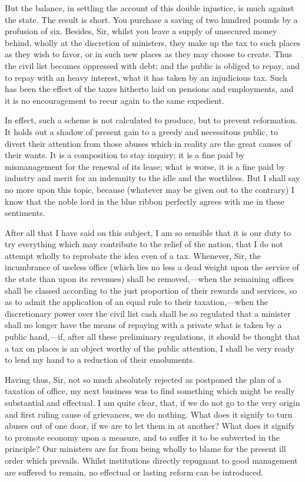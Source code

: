 But the balance, in settling the account of this double injustice, is much against the state. The result is short. You purchase a saving of two hundred pounds by a profusion of six. Besides, Sir, whilst you leave a supply of unsecured money behind, wholly at the discretion of ministers, they make up the tax to such places as they wish to favor, or in such new places as they may choose to create. Thus the civil list becomes oppressed with debt; and the public is obliged to repay, and to repay with an heavy interest, what it has taken by an injudicious tax. Such has been the effect of the taxes hitherto laid on pensions and employments, and it is no encouragement to recur again to the same expedient.

In effect, such a scheme is not calculated to produce, but to prevent reformation. It holds out a shadow of present gain to a greedy and necessitous public, to divert their attention from those abuses which in reality are the great causes of their wants. It is a composition to stay inquiry; it is a fine paid by mismanagement for the renewal of its lease; what is worse, it is a fine paid by industry and merit for an indemnity to the idle and the worthless. But I shall say no more upon this topic, because (whatever may be given out to the contrary) I know that the noble lord in the blue ribbon perfectly agrees with me in these sentiments.

After all that I have said on this subject, I am so sensible that it is our duty to try everything which may contribute to the relief of the nation, that I do not attempt wholly to reprobate the idea even of a tax. Whenever, Sir, the incumbrance of useless office (which lies no less a dead weight upon the service of the state than upon its revenues) shall be removed,—when the remaining offices shall be classed according to the just proportion of their rewards and services, so as to admit the application of an equal rule to their taxation,—when the discretionary power over the civil list cash shall be so regulated that a minister shall no longer have the means of repaying with a private what is taken by a public hand,—if, after all these preliminary regulations, it should be thought that a tax on places is an object worthy of the public attention, I shall be very ready to lend my hand to a reduction of their emoluments.

Having thus, Sir, not so much absolutely rejected as postponed the plan of a taxation of office, my next business was to find something which might be really substantial and effectual. I am quite clear, that, if we do not go to the very origin and first ruling cause of grievances, we do nothing. What does it signify to turn abuses out of one door, if we are to let them in at another? What does it signify to promote economy upon a measure, and to suffer it to be subverted in the principle? Our ministers are far from being wholly to blame for the present ill order which prevails. Whilst institutions directly repugnant to good management are suffered to remain, no effectual or lasting reform can be introduced.

